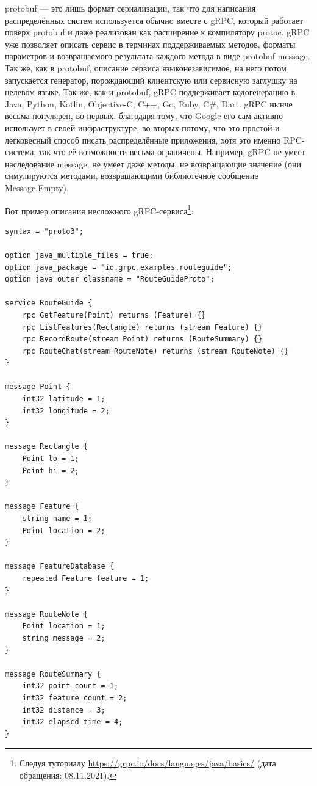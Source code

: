 \documentclass[a5paper]{article}
\begin{document}
protobuf --- это лишь формат сериализации, так что для написания распределённых систем используется обычно вместе с gRPC, который работает поверх protobuf и даже реализован как расширение к компилятору protoc. gRPC уже позволяет описать сервис в терминах поддерживаемых методов, форматы параметров и возвращаемого результата каждого метода в виде protobuf message. Так же, как в protobuf, описание сервиса языконезависимое, на него потом запускается генератор, порождающий клиентскую или сервисную заглушку на целевом языке. Так же, как и protobuf, gRPC поддерживает кодогенерацию в Java, Python, Kotlin, Objective-C, C++, Go, Ruby, C\#, Dart. gRPC нынче весьма популярен, во-первых, благодаря тому, что Google его сам активно использует в своей инфраструктуре, во-вторых потому, что это простой и легковесный способ писать распределённые приложения, хотя это именно RPC-система, так что её возможности весьма ограничены. Например, gRPC не умеет наследование message, не умеет даже методы, не возвращающие значение (они симулируются методами, возвращающими библиотечное сообщение Message.Empty).

Вот пример описания несложного gRPC-сервиса\footnote{Следуя туториалу \url{https://grpc.io/docs/languages/java/basics/} (дата обращения: 08.11.2021).}:

\begin{verbatim}
syntax = "proto3";

option java_multiple_files = true;
option java_package = "io.grpc.examples.routeguide";
option java_outer_classname = "RouteGuideProto";

service RouteGuide {
    rpc GetFeature(Point) returns (Feature) {}
    rpc ListFeatures(Rectangle) returns (stream Feature) {}
    rpc RecordRoute(stream Point) returns (RouteSummary) {}
    rpc RouteChat(stream RouteNote) returns (stream RouteNote) {}
}

message Point {
    int32 latitude = 1;
    int32 longitude = 2;
}

message Rectangle {
    Point lo = 1;
    Point hi = 2;
}

message Feature {
    string name = 1;
    Point location = 2;
}

message FeatureDatabase {
    repeated Feature feature = 1;
}

message RouteNote {
    Point location = 1;
    string message = 2;
}

message RouteSummary {
    int32 point_count = 1;
    int32 feature_count = 2;
    int32 distance = 3;
    int32 elapsed_time = 4;
}
\end{verbatim}
\end{document}

